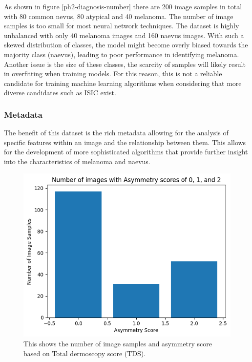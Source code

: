 As shown in figure \ref{ph2-diagnosis-number} there are 200 image samples in total with 80 common nevus, 80 atypical and 40 melanoma. The number of image samples is too small for most neural network techniques. The dataset is highly unbalanced with only 40 melanoma images and 160 naevus images. With such a skewed distribution of classes, the model might become overly biased towards the majority class (naevus), leading to poor performance in identifying melanoma. Another issue is the size of these classes, the scarcity of samples will likely result in overfitting when training models. For this reason, this is not a reliable candidate for training machine learning algorithms when considering that more diverse candidates such as ISIC exist.

\subsubsection{Metadata}
The benefit of this dataset is the rich metadata allowing for the analysis of specific features within an image and the relationship between them. This allows for the development of more sophisticated algorithms that provide further insight into the characteristics of melanoma and naevus.

\begin{figure}
	\centering
	\includegraphics[scale=0.8]{images/ph2/ph2-asym-number.png}
	\caption{This shows the number of image samples and asymmetry score based on Total dermoscopy score (TDS).} 
\end{figure} \label{ph2-asym-number}

